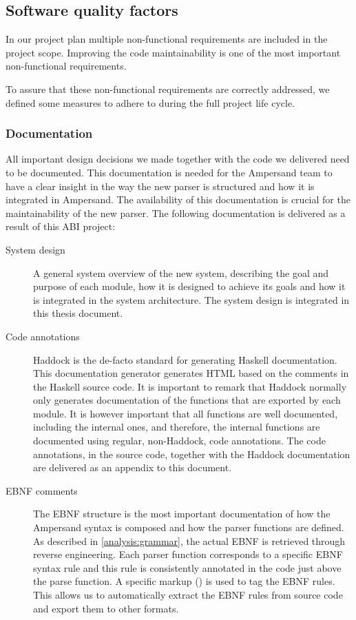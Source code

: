 
\subsection{Software quality factors}
\label{design:software-quality}
In our project plan  multiple non-functional requirements are included in the project scope.
Improving the code maintainability is one of the most important non-functional requirements.

To assure that these non-functional requirements are correctly addressed, we defined some measures to adhere to during the full project life cycle.

\subsubsection{Documentation}
All important design decisions we made together with the code we delivered need to be documented.
This documentation is needed for the Ampersand team to have a clear insight in the way the new parser is structured and how it is integrated in Ampersand.
The availability of this documentation is crucial for the maintainability of the new parser.
The following documentation is delivered as a result of this ABI project:
%
%
\begin{description}
  \item[System design]
    A general system overview of the new system, describing the goal and purpose of each module, how it is designed to achieve its goals and how it is integrated in the system architecture.
   The system design is integrated in this thesis document.
  \item[Code annotations]
    Haddock is the de-facto standard for generating Haskell documentation. 
    This documentation generator generates HTML based on the comments in the Haskell source code.
    It is important to remark that Haddock normally only generates documentation of the functions that are exported by each module.
    It is however important that all functions are well documented, including the internal ones, and therefore, the internal functions are documented using regular, non-Haddock, code annotations.
    The code annotations, in the source code, together with the Haddock documentation are delivered as an appendix to this document.
  \item[EBNF comments]
    The EBNF structure is the most important documentation of how the Ampersand syntax is composed and how the parser functions are defined.
    As described in \autoref{analysis:grammar}, the actual EBNF is retrieved through reverse engineering.
    Each parser function corresponds to a specific EBNF syntax rule and this rule is consistently annotated in the code just above the parse function.
  A specific markup (\code{------}) is used to tag the EBNF rules.
  This allows us to automatically extract the EBNF rules from source code and export them to other formats.
\end{description}

